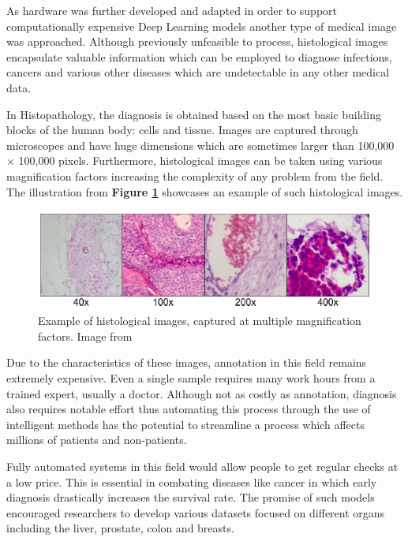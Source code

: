 \documentclass[conference]{IEEEtran}
\begin{document}
As hardware was further developed and adapted in order to support computationally expensive Deep Learning models another type of medical image was approached. Although previously unfeasible to process, histological images encapsulate valuable information which can be employed to diagnose infections, cancers and various other diseases which are undetectable in any other medical data. 

In Histopathology, the diagnosis is obtained based on the most basic building blocks of the human body: cells and tissue. Images are captured through microscopes and have huge dimensions which are sometimes larger than 100,000 $\times$ 100,000 pixels. Furthermore, histological images can be taken using various magnification factors increasing the complexity of any problem from the field. The illustration from \textbf{Figure \ref{histo_img}} showcases an example of such histological images.

\begin{figure}[htb]
    \centering
	\centerline{\includegraphics[scale=0.7]{figures/breast_histoimg_multiple_scales.png}}
	\caption{Example of histological images, captured at multiple magnification factors. Image from \cite{bayramoglu2016deep}}
	\label{histo_img}
\end{figure}

Due to the characteristics of these images, annotation in this field remains extremely expensive. Even a single sample requires many work hours from a trained expert, usually a doctor. Although not as costly as annotation, diagnosis also requires notable effort thus automating this process through the use of intelligent methods has the potential to streamline a process which affects millions of patients and non-patients. 

Fully automated systems in this field would allow people to get regular checks at a low price. This is essential in combating diseases like cancer in which early diagnosis drastically increases the survival rate. The promise of such models encouraged researchers to develop various datasets focused on different organs including the liver, prostate, colon and breasts.
\end{document}
